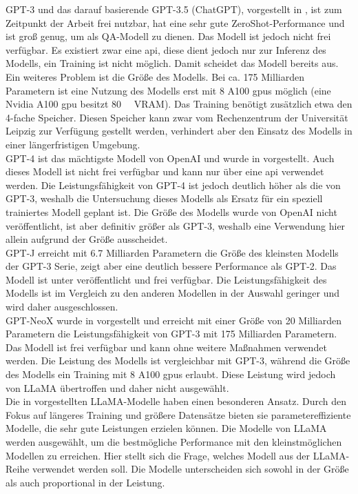 GPT-3 und das darauf basierende GPT-3.5 (ChatGPT), vorgestellt in \citet{gpt3}, ist zum Zeitpunkt der Arbeit frei nutzbar, hat eine sehr gute ZeroShot-Performance und ist groß genug, um als QA-Modell zu dienen.
Das Modell ist jedoch nicht frei verfügbar.
Es existiert zwar eine \ac{api}, diese dient jedoch nur zur Inferenz des Modells, ein Training ist nicht möglich.
Damit scheidet das Modell bereits aus.
Ein weiteres Problem ist die Größe des Modells.
Bei ca. 175 Milliarden Parametern ist eine Nutzung des Modells erst mit 8 A100 \ac{gpu}s möglich (eine Nvidia A100 \ac{gpu} besitzt \SI{80}{\giga\byte} VRAM).
Das Training benötigt zusätzlich etwa den 4-fache Speicher.
Diesen Speicher kann zwar vom Rechenzentrum der Universität Leipzig zur Verfügung gestellt werden, verhindert aber den Einsatz des Modells in einer längerfristigen Umgebung.\\

GPT-4 ist das mächtigste Modell von OpenAI und wurde in \citet{gpt4} vorgestellt.
Auch dieses Modell ist nicht frei verfügbar und kann nur über eine \ac{api} verwendet werden.
Die Leistungsfähigkeit von GPT-4 ist jedoch deutlich höher als die von GPT-3, weshalb die Untersuchung dieses Modells als Ersatz für ein speziell trainiertes Modell geplant ist.
Die Größe des Modells wurde von OpenAI nicht veröffentlicht, ist aber definitiv größer als GPT-3, weshalb eine Verwendung hier allein aufgrund der Größe ausscheidet.\\

GPT-J erreicht mit \SI{6,7}{} Milliarden Parametern die Größe des kleinsten Modells der GPT-3 Serie, zeigt aber eine deutlich bessere Performance als GPT-2.
Das Modell ist unter \citet{gptj} veröffentlicht und frei verfügbar.
Die Leistungsfähigkeit des Modells ist im Vergleich zu den anderen Modellen in der Auswahl geringer und wird daher ausgeschlossen.\\

GPT-NeoX wurde in \citet{gpt_neox} vorgestellt und erreicht mit einer Größe von 20 Milliarden Parametern die Leistungsfähigkeit von GPT-3 mit 175 Milliarden Parametern.
Das Modell ist frei verfügbar und kann ohne weitere Maßnahmen verwendet werden.
Die Leistung des Modells ist vergleichbar mit GPT-3, während die Größe des Modells ein Training mit 8 A100 \ac{gpu}s erlaubt.
Diese Leistung wird jedoch von LLaMA übertroffen und daher nicht ausgewählt.\\

Die in \citet{llama} vorgestellten LLaMA-Modelle haben einen besonderen Ansatz.
Durch den Fokus auf längeres Training und größere Datensätze bieten sie parametereffiziente Modelle, die sehr gute Leistungen erzielen können.
Die Modelle von LLaMA werden ausgewählt, um die bestmögliche Performance mit den kleinstmöglichen Modellen zu erreichen.
Hier stellt sich die Frage, welches Modell aus der LLaMA-Reihe verwendet werden soll.
Die Modelle unterscheiden sich sowohl in der Größe als auch proportional in der Leistung.\\

